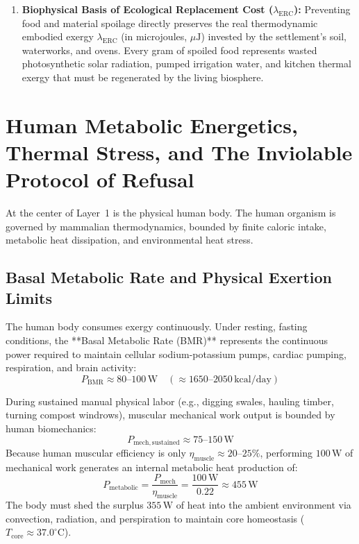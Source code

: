 \begin{enumerate}
    \item \textbf{Biophysical Basis of Ecological Replacement Cost ($\lambda_{\mathrm{ERC}}$):} Preventing food and material spoilage directly preserves the real thermodynamic embodied exergy $\lambda_{\mathrm{ERC}}$ (in microjoules, $\mu\mathrm{J}$) invested by the settlement's soil, waterworks, and ovens. Every gram of spoiled food represents wasted photosynthetic solar radiation, pumped irrigation water, and kitchen thermal exergy that must be regenerated by the living biosphere.
\end{enumerate}

\section{Human Metabolic Energetics, Thermal Stress, and The Inviolable Protocol of Refusal}

At the center of Layer~1 is the physical human body. The human organism is governed by mammalian thermodynamics, bounded by finite caloric intake, metabolic heat dissipation, and environmental heat stress.

\subsection{Basal Metabolic Rate and Physical Exertion Limits}

The human body consumes exergy continuously. Under resting, fasting conditions, the **Basal Metabolic Rate (BMR)** represents the continuous power required to maintain cellular sodium-potassium pumps, cardiac pumping, respiration, and brain activity:
\begin{equation}
P_{\mathrm{BMR}} \approx 80\text{--}100\,\mathrm{W} \quad (\approx 1650\text{--}2050\,\mathrm{kcal/day})
\label{eq:bmr_power}
\end{equation}

During sustained manual physical labor (e.g., digging swales, hauling timber, turning compost windrows), muscular mechanical work output is bounded by human biomechanics:
\begin{equation}
P_{\mathrm{mech, sustained}} \approx 75\text{--}150\,\mathrm{W}
\label{eq:mechanical_output}
\end{equation}
Because human muscular efficiency is only $\eta_{\mathrm{muscle}} \approx 20$--$25\%$, performing $100\,\mathrm{W}$ of mechanical work generates an internal metabolic heat production of:
\begin{equation}
P_{\mathrm{metabolic}} = \frac{P_{\mathrm{mech}}}{\eta_{\mathrm{muscle}}} = \frac{100\,\mathrm{W}}{0.22} \approx 455\,\mathrm{W}
\label{eq:metabolic_heat_gen}
\end{equation}
The body must shed the surplus $355\,\mathrm{W}$ of heat into the ambient environment via convection, radiation, and perspiration to maintain core homeostasis ($T_{\mathrm{core}} \approx 37.0^\circ\mathrm{C}$).

